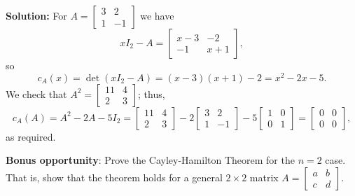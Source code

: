 \documentclass[letterpaper,12pt]{article}
\begin{document}
\begin{enumerate}
\begin{enumerate}
\bigskip

{\bf Solution:} For $A=\begin{bmatrix}3&2\\1&-1\end{bmatrix}$ we have
\[
 xI_2-A = \begin{bmatrix}x-3&-2\\-1&x+1\end{bmatrix},
\]
so 
\[
 c_A(x) = \det(xI_2-A) = (x-3)(x+1)-2 = x^2-2x-5.
\]
We check that $A^2 = \begin{bmatrix}11&4\\2&3\end{bmatrix}$; thus,
\[
 c_A(A) = A^2-2A-5I_2 = \begin{bmatrix}11&4\\2&3\end{bmatrix}-2\begin{bmatrix}3&2\\1&-1\end{bmatrix}-5\begin{bmatrix}1&0\\0&1\end{bmatrix} = \begin{bmatrix}0&0\\0&0\end{bmatrix},
\]
as required.
\end{enumerate}

\bigskip

{\bf Bonus opportunity}: Prove the Cayley-Hamilton Theorem for the $n=2$ case. That is, show that the theorem holds for a general $2\times 2$ matrix $A=\begin{bmatrix}a&b\\c&d\end{bmatrix}$.

\bigskip


\end{enumerate}
\end{document}
